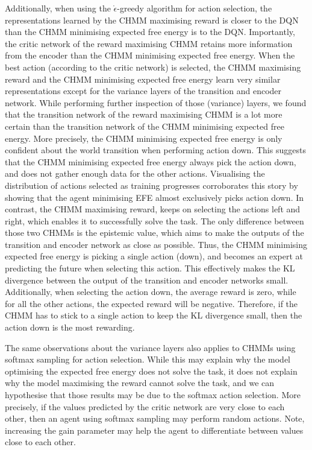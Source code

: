 \documentclass[twoside,11pt]{article}
\begin{document}
Additionally, when using the $\mathring{\epsilon}$-greedy algorithm for action selection, the representations learned by the CHMM maximising reward is closer to the DQN than the CHMM minimising expected free energy is to the DQN. Importantly, the critic network of the reward maximising CHMM retains more information from the encoder than the CHMM minimising expected free energy. When the best action (according to the critic network) is selected, the CHMM maximising reward and the CHMM minimising expected free energy learn very similar representations except for the variance layers of the transition and encoder network. While performing further inspection of those (variance) layers, we found that the transition network of the reward maximising CHMM is a lot more certain than the transition network of the CHMM minimising expected free energy. More precisely, the CHMM minimising expected free energy is only confident about the world transition when performing action down. This suggests that the CHMM minimising expected free energy always pick the action down, and does not gather enough data for the other actions. Visualising the distribution of actions selected as training progresses corroborates this story by showing that the agent minimising EFE almost exclusively picks action down. In contrast, the CHMM maximising reward, keeps on selecting the actions left and right, which enables it to successfully solve the task. The only difference between those two CHMMs is the epistemic value, which aims to make the outputs of the transition and encoder network as close as possible. Thus, the CHMM minimising expected free energy is picking a single action (down), and becomes an expert at predicting the future when selecting this action. This effectively makes the KL divergence between the output of the transition and encoder networks small. Additionally, when selecting the action down, the average reward is zero, while for all the other actions, the expected reward will be
negative. Therefore, if the CHMM has to stick to a single action to keep the KL divergence small, then the action down
is the most rewarding.

The same observations about the variance layers also applies to CHMMs using softmax sampling for action selection. While this may explain why the model optimising the expected free energy does not solve the task, it does not explain why the model maximising the reward cannot solve the task, and we can hypothesise that those results may be due to the softmax action selection. More precisely, if the values predicted by the critic network are very close to each other, then an agent using softmax sampling may perform random actions. Note, increasing the gain parameter may help the agent to differentiate between values close to each other.
\end{document}
